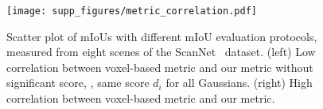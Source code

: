 \begin{figure}[h!]
    \centering
        \texttt{[image: supp\_figures/metric\_correlation.pdf]}
    \vspace{-3mm}
    \caption{Scatter plot of mIoUs with different mIoU evaluation protocols, measured from eight scenes of the ScanNet~\cite{dai2017scannet} dataset. (left) Low correlation between voxel-based metric and our metric without significant score, \ie, same score $d_i$ for all Gaussians. (right) High correlation between voxel-based metric and our metric.}
    \label{fig:metric_correlation}
\end{figure}